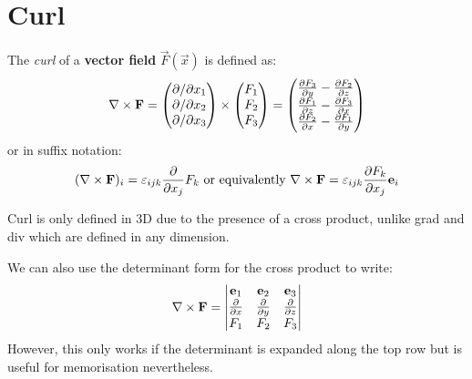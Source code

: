 \documentclass[../main.tex]{subfiles}
\begin{document}
\section{Curl}
\label{secCurl}
\begin{definition}[Curl]
  The \textit{curl} of a \textbf{vector field} $\vec{F}(\vec{x})$ is defined as:
  \[
    \nabla \times \vec{F} = \begin{pmatrix}
      \partial/\partial x_1 \\
      \partial/\partial x_2 \\
      \partial/\partial x_3 \\
      \end{pmatrix} \times
      \begin{pmatrix}
      F_1 \\
      F_2 \\
      F_3 \\
      \end{pmatrix} =
      \begin{pmatrix}
      \pderiv{F_3}{y} - \pderiv{F_2}{z} \\
      \pderiv{F_1}{z} - \pderiv{F_3}{x} \\
      \pderiv{F_2}{x} - \pderiv{F_1}{y} \\
      \end{pmatrix}
  \]
  or in suffix notation:
  \[
    (\nabla \times \vec{F})_i = \levi_{i j k} \pderiv{}{x_j} F_k \text{ or equivalently } \nabla \times \vec{F} = \levi_{i j k} \pderiv{F_k}{x_j} \vec{e}_i
  \]
\end{definition}
\begin{remark}
  Curl is only defined in 3D due to the presence of a cross product, unlike grad and div which are defined in any dimension.
\end{remark}
We can also use the determinant form for the cross product to write:
\[
  \nabla \times \vec{F} = \begin{vmatrix}
  \vec{e}_1 & \vec{e}_2 & \vec{e}_3 \\
  \pderiv{}{x} & \pderiv{}{y} & \pderiv{}{z} \\
  F_1 & F_2 & F_3 \\
  \end{vmatrix}
\]
However, this only works if the determinant is expanded along the top row but is useful for memorisation nevertheless.
\end{document}
